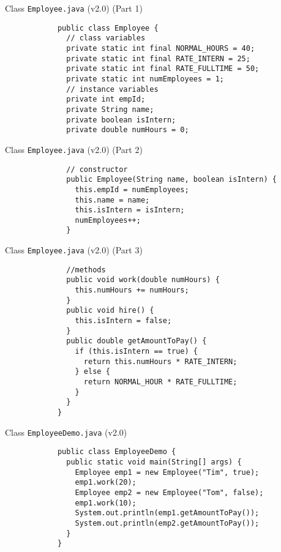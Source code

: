\documentclass[10pt, compress]{beamer}
\begin{document}
\begin{slide}
	\begin{block}{Class \texttt{Employee.java} (v2.0) (Part 1)}
		\begin{verbatim}
			public class Employee {
			  // class variables
			  private static int final NORMAL_HOURS = 40;
			  private static int final RATE_INTERN = 25;
			  private static int final RATE_FULLTIME = 50;
			  private static int numEmployees = 1;
			  // instance variables
			  private int empId;
			  private String name;
			  private boolean isIntern;
			  private double numHours = 0;
		\end{verbatim}
	\end{block}
\end{slide}

\begin{slide}
	\begin{block}{Class \texttt{Employee.java} (v2.0) (Part 2)}
		\begin{verbatim}
			  // constructor
			  public Employee(String name, boolean isIntern) {
			    this.empId = numEmployees;
			    this.name = name;
			    this.isIntern = isIntern;
			    numEmployees++;
			  }
		\end{verbatim}
	\end{block}
\end{slide}

\begin{slide}
	\begin{block}{Class \texttt{Employee.java} (v2.0) (Part 3)}
		\begin{verbatim}
			  //methods
			  public void work(double numHours) {
			    this.numHours += numHours;
			  }
			  public void hire() {
			    this.isIntern = false;
			  }
			  public double getAmountToPay() {
			    if (this.isIntern == true) {
			      return this.numHours * RATE_INTERN;
			    } else {
			      return NORMAL_HOUR * RATE_FULLTIME;
			    }
			  }
			}
		\end{verbatim}
	\end{block}
\end{slide}

\begin{slide}
	\begin{block}{Class \texttt{EmployeeDemo.java} (v2.0)}
		\begin{verbatim}
			public class EmployeeDemo {
			  public static void main(String[] args) {
			    Employee emp1 = new Employee("Tim", true);
			    emp1.work(20);
			    Employee emp2 = new Employee("Tom", false);
			    emp1.work(10);
			    System.out.println(emp1.getAmountToPay());
			    System.out.println(emp2.getAmountToPay());
			  }
			}
		\end{verbatim}
	\end{block}
\end{slide}
\end{document}
